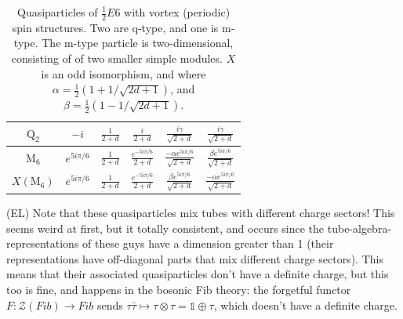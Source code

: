 \documentclass[12pt,a4paper]{article}
\newcounter{arrow}
\newcommand{\tp}{\otimes}
\newcommand{\ra}{\rightarrow}
\newcommand{\unit}{\mathds{1}}
\newcommand{\mcz}{\mathcal{Z}}
\newcommand{\ethan}[1]{{\color{amethyst}\footnotesize{(EL) #1}}}
\begin{document}
\begin{table}
{{\begin{tabu}{c  c | c c c c }
$\text{Q}_2$&$-i$ &$ \frac{1}{2+d} $& $\frac{i}{2+d}$ & $\frac{i \gamma}{\sqrt{2+d}}$ & $\frac{i \gamma}{\sqrt{2+d}}$ \\ \hline 
$\text{M}_6$&$e^{5i \pi/6}$&$ \frac{1}{2+d} $&$ \frac{e^{-5i\pi/6}}{2+d} $ & $\frac{- \alpha e^{5 i \pi/6}}{\sqrt{2+d}}$ & $\frac{\beta e^{5 i \pi /6}}{\sqrt{2+d}}$ \\ 
$X(\text{M}_6)$&$e^{5i \pi/6}$&$ \frac{1}{2+d} $&$ \frac{e^{-5i\pi/6}}{2+d} $ &  $\frac{\beta e^{5 i \pi /6}}{\sqrt{2+d}}$  &$\frac{- \alpha e^{5 i \pi/6}}{\sqrt{2+d}}$ 
\end{tabu}
   }
\caption{Quasiparticles of $\frac{1}{2} E6$ with vortex (periodic) spin structures. Two are q-type, and one is m-type. The m-type particle is two-dimensional, consisting of of two smaller simple modules.  $X$ is an odd isomorphism, and where %
$\alpha = \frac{1}{2} \left( 1+ 1/\sqrt{2d+1} \right)$, and $\beta = \frac{1}{2} \left( 1- 1/\sqrt{2d+1} \right)$.}}
\end{table}



\ethan{Note that these quasiparticles mix tubes with different charge sectors! This seems weird at first, but it totally consistent, and occurs since the tube-algebra-representations of these guys have a dimension greater than 1 (their representations have off-diagonal parts that mix different charge sectors). This means that their associated quasiparticles don't have a definite charge, but this too is fine, and happens in the bosonic Fib theory: the forgetful functor $F:\mcz(Fib) \ra Fib$ sends $\tau\bar\tau \mapsto \tau\tp\tau = \unit\oplus\tau$, which doesn't have a definite charge.}
\end{document}
